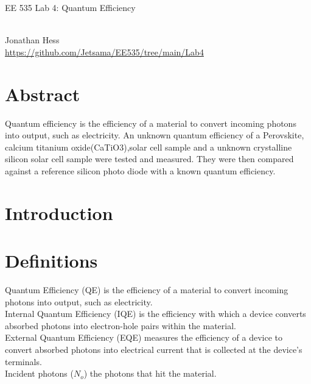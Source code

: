 \documentclass[10pt,a4paper]{article}
\begin{document}
\begin{multicols}{2}
\newenvironment{indentPar}[1]%
 {\begin{list}{}%
         {\setlength{\leftmargin}{#1}}%
         \item[]%
 }
 {\end{list}}

\begin{flushleft}
\begin{LARGE}EE 535 Lab 4: Quantum Efficiency
\end{LARGE}	
\\Jonathan Hess
\\\href{https://github.com/Jetsama/EE535/tree/main/Lab4}{https://github.com/Jetsama/EE535/tree/main/Lab4}
\end{flushleft}


\section*{Abstract}
Quantum efficiency is the efficiency of a material to convert incoming photons into output, such as electricity. An unknown quantum efficiency of a Perovskite, calcium titanium oxide(CaTiO3),solar cell sample and a unknown crystalline silicon solar cell sample were tested and measured. They were then compared against a reference silicon photo diode with a known quantum efficiency.
	





\section*{Introduction}






\section*{Definitions}
Quantum Efficiency (QE) is the efficiency of a material to convert incoming photons into output, such as electricity.\\


Internal Quantum Efficiency (IQE) is the efficiency with which a device  converts absorbed photons into electron-hole pairs within the material.\\
External Quantum Efficiency (EQE) measures the efficiency of a device to convert absorbed photons into electrical current that is collected at the device's terminals.\\
Incident photons ($N_o$) the photons that hit the material.


\end{multicols}
\end{document}
